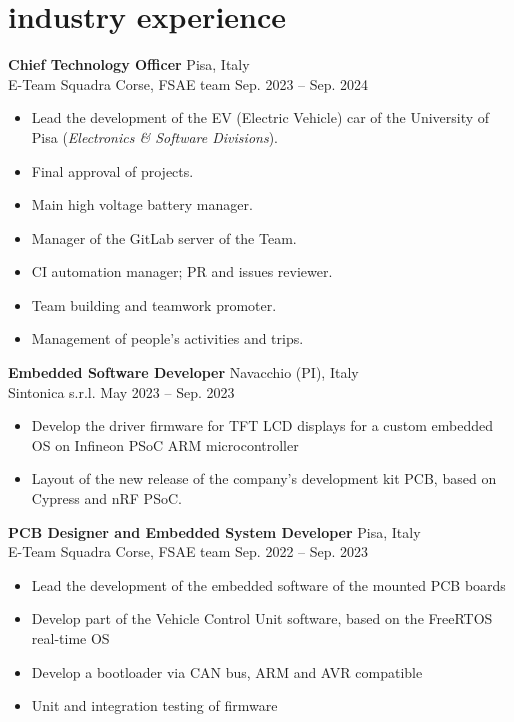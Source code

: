 \documentclass[10pt]{article}
\newcommand{\entry}[4]{{{\textbf{#1}}} \hfill #3 \\ #2 \hfill #4}
\begin{document}
\section{industry experience}

\entry{Chief Technology Officer}{E-Team Squadra Corse, FSAE team}{Pisa, Italy}{Sep. 2023 -- Sep. 2024}
\begin{itemize}[noitemsep,leftmargin=3.5mm,rightmargin=0mm,topsep=6pt]
    \item Lead the development of the EV (Electric Vehicle) car of the University of Pisa (\textit{Electronics \& Software Divisions}).
    \item Final approval of projects.
    \item Main high voltage battery manager.
    \item Manager of the GitLab server of the Team.
    \item CI automation manager; PR and issues reviewer.
    \item Team building and teamwork promoter.
    \item Management of people's activities and trips.
\end{itemize}

\smallskip

\entry{Embedded Software Developer}{Sintonica s.r.l.}{Navacchio (PI), Italy}{May 2023 -- Sep. 2023}
\begin{itemize}[noitemsep,leftmargin=3.5mm,rightmargin=0mm,topsep=6pt]
    \item Develop the driver firmware for TFT LCD displays for a custom embedded OS on Infineon PSoC ARM microcontroller
    \item Layout of the new release of the company's development kit PCB, based on Cypress and nRF PSoC.
\end{itemize}

\smallskip

\entry{PCB Designer and Embedded System Developer}{E-Team Squadra Corse, FSAE team}{Pisa, Italy}{Sep. 2022 -- Sep. 2023}
\begin{itemize}[noitemsep,leftmargin=3.5mm,rightmargin=0mm,topsep=6pt]
    \item Lead the development of the embedded software of the mounted PCB boards
    \item Develop part of the Vehicle Control Unit software, based on the FreeRTOS real-time OS
    \item Develop a bootloader via CAN bus, ARM and AVR compatible
    \item Unit and integration testing of firmware
\end{itemize}
\end{document}
